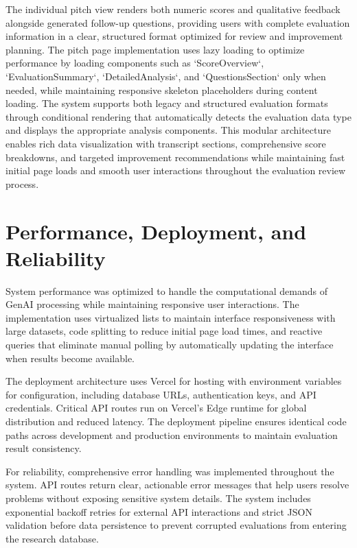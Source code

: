 The individual pitch view renders both numeric scores and qualitative feedback alongside generated follow-up questions, providing users with complete evaluation information in a clear, structured format optimized for review and improvement planning. The pitch page implementation uses lazy loading to optimize performance by loading components such as `ScoreOverview`, `EvaluationSummary`, `DetailedAnalysis`, and `QuestionsSection` only when needed, while maintaining responsive skeleton placeholders during content loading. The system supports both legacy and structured evaluation formats through conditional rendering that automatically detects the evaluation data type and displays the appropriate analysis components. This modular architecture enables rich data visualization with transcript sections, comprehensive score breakdowns, and targeted improvement recommendations while maintaining fast initial page loads and smooth user interactions throughout the evaluation review process.

\section{Performance, Deployment, and Reliability}

System performance was optimized to handle the computational demands of GenAI processing while maintaining responsive user interactions. The implementation uses virtualized lists to maintain interface responsiveness with large datasets, code splitting to reduce initial page load times, and reactive queries that eliminate manual polling by automatically updating the interface when results become available.

The deployment architecture uses Vercel for hosting with environment variables for configuration, including database URLs, authentication keys, and API credentials. Critical API routes run on Vercel's Edge runtime for global distribution and reduced latency. The deployment pipeline ensures identical code paths across development and production environments to maintain evaluation result consistency.

For reliability, comprehensive error handling was implemented throughout the system. API routes return clear, actionable error messages that help users resolve problems without exposing sensitive system details. The system includes exponential backoff retries for external API interactions and strict JSON validation before data persistence to prevent corrupted evaluations from entering the research database.


